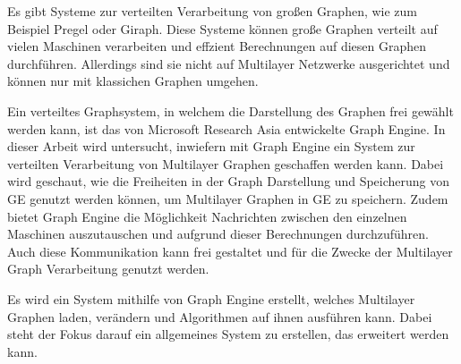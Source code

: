 Es gibt Systeme zur verteilten Verarbeitung von großen Graphen, wie zum Beispiel Pregel oder Giraph. Diese Systeme können große Graphen verteilt auf vielen Maschinen verarbeiten und effzient Berechnungen auf diesen Graphen durchführen. Allerdings sind sie nicht auf Multilayer Netzwerke ausgerichtet und können nur mit klassichen Graphen umgehen.


Ein verteiltes Graphsystem, in welchem die Darstellung des Graphen frei gewählt werden kann, ist das von Microsoft Research Asia entwickelte Graph Engine.
In dieser Arbeit wird untersucht, inwiefern mit Graph Engine ein System zur verteilten Verarbeitung von Multilayer Graphen geschaffen werden kann. Dabei wird geschaut, wie die Freiheiten in der Graph Darstellung und Speicherung von GE genutzt werden können,
um Multilayer Graphen in GE zu speichern. Zudem bietet Graph Engine die Möglichkeit Nachrichten zwischen den einzelnen Maschinen auszutauschen und aufgrund dieser Berechnungen durchzuführen. Auch diese Kommunikation kann frei gestaltet und für die Zwecke der Multilayer Graph Verarbeitung genutzt werden.

Es wird ein System mithilfe von Graph Engine erstellt, welches Multilayer Graphen laden, verändern und Algorithmen auf ihnen ausführen kann. 
Dabei steht der Fokus darauf ein allgemeines System zu erstellen, das erweitert werden kann. 

